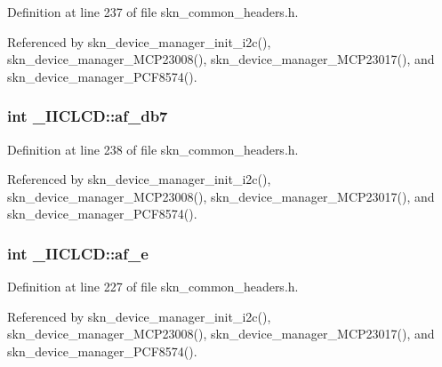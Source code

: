 Definition at line 237 of file skn\+\_\+common\+\_\+headers.\+h.



Referenced by skn\+\_\+device\+\_\+manager\+\_\+init\+\_\+i2c(), skn\+\_\+device\+\_\+manager\+\_\+\+M\+C\+P23008(), skn\+\_\+device\+\_\+manager\+\_\+\+M\+C\+P23017(), and skn\+\_\+device\+\_\+manager\+\_\+\+P\+C\+F8574().

\subsubsection[{\texorpdfstring{af\+\_\+db7}{af_db7}}]{\setlength{\rightskip}{0pt plus 5cm}int \+\_\+\+I\+I\+C\+L\+C\+D\+::af\+\_\+db7}\hypertarget{struct___i_i_c_l_c_d_ae55385ca612fd157fb85e7b3d5423ee4}{}\label{struct___i_i_c_l_c_d_ae55385ca612fd157fb85e7b3d5423ee4}


Definition at line 238 of file skn\+\_\+common\+\_\+headers.\+h.



Referenced by skn\+\_\+device\+\_\+manager\+\_\+init\+\_\+i2c(), skn\+\_\+device\+\_\+manager\+\_\+\+M\+C\+P23008(), skn\+\_\+device\+\_\+manager\+\_\+\+M\+C\+P23017(), and skn\+\_\+device\+\_\+manager\+\_\+\+P\+C\+F8574().

\subsubsection[{\texorpdfstring{af\+\_\+e}{af_e}}]{\setlength{\rightskip}{0pt plus 5cm}int \+\_\+\+I\+I\+C\+L\+C\+D\+::af\+\_\+e}\hypertarget{struct___i_i_c_l_c_d_a896f8305b5c0395ea7f9074904047b32}{}\label{struct___i_i_c_l_c_d_a896f8305b5c0395ea7f9074904047b32}


Definition at line 227 of file skn\+\_\+common\+\_\+headers.\+h.



Referenced by skn\+\_\+device\+\_\+manager\+\_\+init\+\_\+i2c(), skn\+\_\+device\+\_\+manager\+\_\+\+M\+C\+P23008(), skn\+\_\+device\+\_\+manager\+\_\+\+M\+C\+P23017(), and skn\+\_\+device\+\_\+manager\+\_\+\+P\+C\+F8574().

